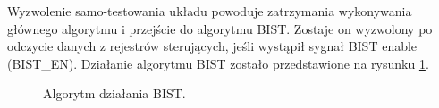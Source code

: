         Wyzwolenie samo-testowania układu powoduje zatrzymania wykonywania głównego algorytmu i przejście do algorytmu BIST. 
        Zostaje on wyzwolony po odczycie danych z rejestrów sterujących, jeśli wystąpił sygnał BIST enable (BIST\_EN). 
        Działanie algorytmu BIST zostało przedstawione na rysunku \ref{alg:BIST}. 
        \begin{figure}[!ht]
            \centering
            \scalebox{0.8}{}
            \caption{Algorytm działania BIST.}
            \label{alg:BIST}
        \end{figure}